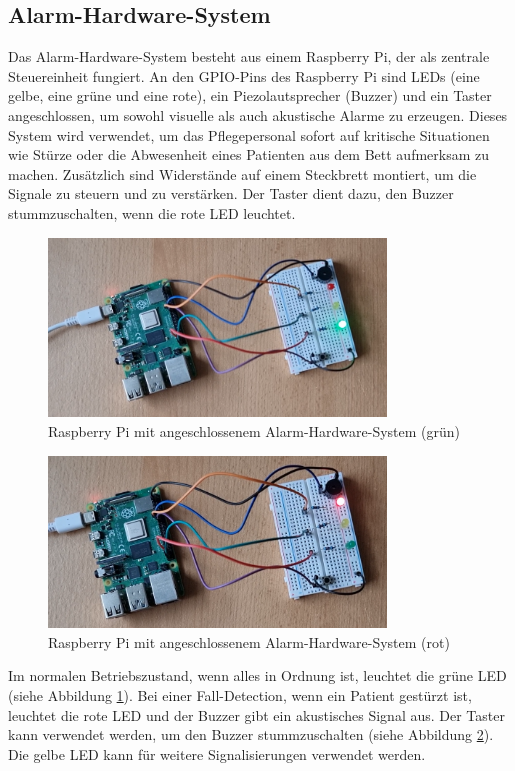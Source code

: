 \subsection{Alarm-Hardware-System}
Das Alarm-Hardware-System besteht aus einem Raspberry Pi, der als zentrale Steuereinheit fungiert. An den GPIO-Pins des Raspberry Pi sind LEDs (eine gelbe, eine grüne und eine rote), ein Piezolautsprecher (Buzzer) und ein Taster angeschlossen, um sowohl visuelle als auch akustische Alarme zu erzeugen. Dieses System wird verwendet, um das Pflegepersonal sofort auf kritische Situationen wie Stürze oder die Abwesenheit eines Patienten aus dem Bett aufmerksam zu machen. Zusätzlich sind Widerstände auf einem Steckbrett montiert, um die Signale zu steuern und zu verstärken. Der Taster dient dazu, den Buzzer stummzuschalten, wenn die rote LED leuchtet.

\begin{figure}[h]
	\centering
	\includegraphics[width=0.8\textwidth]{images/Alarm_grun}
	\caption{Raspberry Pi mit angeschlossenem Alarm-Hardware-System (grün)}
	\label{fig:alarm_system}
\end{figure}

\begin{figure}[h]
	\centering
	\includegraphics[width=0.8\textwidth]{images/Alarm_rot}
	\caption{Raspberry Pi mit angeschlossenem Alarm-Hardware-System (rot)}
	\label{fig:alarm_system_red}
\end{figure}

Im normalen Betriebszustand, wenn alles in Ordnung ist, leuchtet die grüne LED (siehe Abbildung \ref{fig:alarm_system}). Bei einer Fall-Detection, wenn ein Patient gestürzt ist, leuchtet die rote LED und der Buzzer gibt ein akustisches Signal aus. Der Taster kann verwendet werden, um den Buzzer stummzuschalten (siehe Abbildung \ref{fig:alarm_system_red}). Die gelbe LED kann für weitere Signalisierungen verwendet werden.
